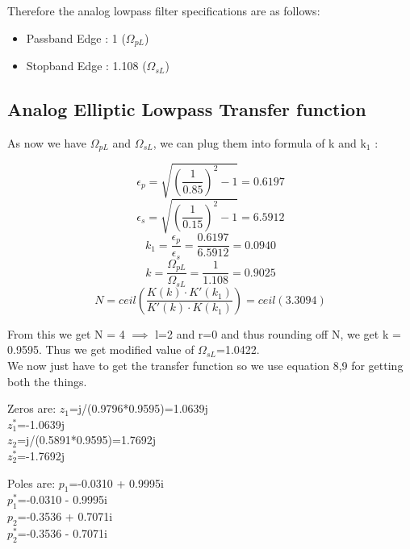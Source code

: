 \documentclass{article}
\begin{document}
\vspace{1em}
\noindent
Therefore the analog lowpass filter specifications are as follows:
\begin{itemize}
    \item Passband Edge : 1 ($\Omega_{pL}$)
    \item Stopband Edge : 1.108 ($\Omega_{sL}$)
\end{itemize}

\subsection{Analog Elliptic Lowpass Transfer function}
As now we have $\Omega_{pL}$ and $\Omega_{sL}$, we can plug them into formula of k and k$_1$ :

\begin{equation*}
    \epsilon_p=\sqrt{(\frac{1}{0.85})^2-1}=0.6197 
\end{equation*}
\begin{equation*}
    \epsilon_s=\sqrt{(\frac{1}{0.15})^2-1}=6.5912 
\end{equation*}
\begin{equation*}
    k_1 = \frac{\epsilon_p}{\epsilon_s} = \frac{0.6197}{6.5912} = 0.0940
\end{equation*}
\begin{equation*}
    k = \frac{\Omega_{pL}}{\Omega_{sL}} = \frac{1}{1.108} = 0.9025
\end{equation*}
\begin{equation*}
N = ceil\left({\frac{K(k)\cdot K'(k_1)}{K'(k)\cdot K(k_1)}}\right) =ceil(3.3094)
\end{equation*}

From this we get N = 4 $\implies$ l=2 and r=0 and thus rounding off N, we get k = 0.9595. 
Thus we get modified value of $\Omega_{sL}$=1.0422.\\

We now just have to get the transfer function so we use equation 8,9 for getting both the things.\\
\begin{center}
Zeros are:
$z_1$=j/(0.9796*0.9595)=1.0639j\\
$z_1^*$=-1.0639j \\
$z_2$=j/(0.5891*0.9595)=1.7692j\\
$z_2^*$=-1.7692j \\
\end{center}
\begin{center}
Poles are:
$p_1$=-0.0310 + 0.9995i \\    
$p_1^*$=-0.0310 - 0.9995i \\
$p_2$=-0.3536 + 0.7071i \\
$p_2^*$=-0.3536 - 0.7071i \\
\end{center}
\end{document}
